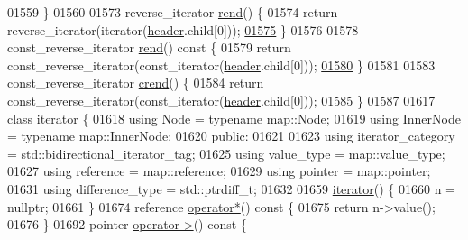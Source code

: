 \begin{DoxyCode}
01559     \}
01560 
01573     reverse\_iterator \hyperlink{classaed2_1_1map_a277f03b4f4b6b98879e4e4921081801f_a277f03b4f4b6b98879e4e4921081801f}{rend}() \{
01574         \textcolor{keywordflow}{return} reverse\_iterator(iterator(\hyperlink{classaed2_1_1map_a92d93f905c8ad73fba18fdc7e8915cce_a92d93f905c8ad73fba18fdc7e8915cce}{header}.child[0]));
\hypertarget{map_8h_source_l01575}{}\hyperlink{classaed2_1_1map_aafce6e53c53c460897613747fec89f9d_aafce6e53c53c460897613747fec89f9d}{01575}     \}
01576 
01578     const\_reverse\_iterator \hyperlink{classaed2_1_1map_a277f03b4f4b6b98879e4e4921081801f_a277f03b4f4b6b98879e4e4921081801f}{rend}()\textcolor{keyword}{ const }\{
01579         \textcolor{keywordflow}{return} const\_reverse\_iterator(const\_iterator(\hyperlink{classaed2_1_1map_a92d93f905c8ad73fba18fdc7e8915cce_a92d93f905c8ad73fba18fdc7e8915cce}{header}.child[0]));
\hypertarget{map_8h_source_l01580}{}\hyperlink{classaed2_1_1map_a40933b2efe1cb479de9195ea947244d1_a40933b2efe1cb479de9195ea947244d1}{01580}     \}
01581 
01583     const\_reverse\_iterator \hyperlink{classaed2_1_1map_a40933b2efe1cb479de9195ea947244d1_a40933b2efe1cb479de9195ea947244d1}{crend}() \{
01584         \textcolor{keywordflow}{return} const\_reverse\_iterator(const\_iterator(\hyperlink{classaed2_1_1map_a92d93f905c8ad73fba18fdc7e8915cce_a92d93f905c8ad73fba18fdc7e8915cce}{header}.child[0]));
01585     \}
01587 
01617     \textcolor{keyword}{class }iterator \{
01618         \textcolor{keyword}{using} Node = \textcolor{keyword}{typename} map::Node;
01619         \textcolor{keyword}{using} InnerNode = \textcolor{keyword}{typename} map::InnerNode;
01620     \textcolor{keyword}{public}:
01621 
01623         \textcolor{keyword}{using} iterator\_category = std::bidirectional\_iterator\_tag;
01625         \textcolor{keyword}{using} value\_type = map::value\_type;
01627         \textcolor{keyword}{using} reference = map::reference;
01629         \textcolor{keyword}{using} pointer = map::pointer;
01631         \textcolor{keyword}{using} difference\_type = std::ptrdiff\_t;
01632 
01659         \hyperlink{classaed2_1_1map_1_1iterator_acdd790eb54216601a2e0591776004dba_acdd790eb54216601a2e0591776004dba}{iterator}() \{
01660             n = \textcolor{keyword}{nullptr};
01661         \}
01674         reference \hyperlink{classaed2_1_1map_1_1iterator_a48e75896997d516fe69bc18f889222fe_a48e75896997d516fe69bc18f889222fe}{operator*}()\textcolor{keyword}{ const }\{
01675             \textcolor{keywordflow}{return} n->value();
01676         \}
01692         pointer \hyperlink{classaed2_1_1map_1_1iterator_a227de3b56a6ff2e6bb6de2d08277ca60_a227de3b56a6ff2e6bb6de2d08277ca60}{operator->}()\textcolor{keyword}{ const }\{

\end{DoxyCode}
